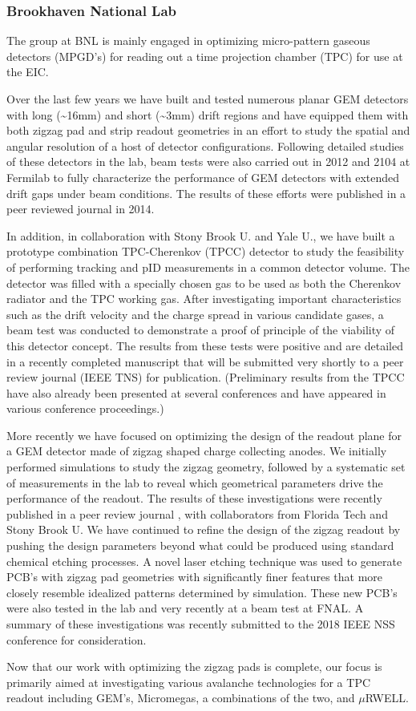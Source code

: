 \subsubsection{Brookhaven National Lab} 
The group at BNL is mainly engaged in optimizing micro-pattern gaseous detectors (MPGD’s) for reading out a time projection chamber (TPC) for use at the EIC. 

Over the last few years we have built and tested numerous planar GEM detectors with long (\textasciitilde16mm) and short (\textasciitilde3mm) drift regions and have equipped them with both zigzag pad and strip readout geometries in an effort to study the spatial and angular resolution of a host of detector configurations. Following detailed studies of these detectors in the lab, beam tests were also carried out in 2012 and 2104 at Fermilab to fully characterize the performance of GEM detectors with extended drift gaps under beam conditions. The results of these efforts were published in a peer reviewed journal in 2014\cite{7497629}.

In addition, in collaboration with Stony Brook U. and Yale U., we have built a prototype combination TPC-Cherenkov (TPCC) detector to study the feasibility of performing tracking and pID measurements in a common detector volume. The detector was filled with a specially chosen gas to be used as both the Cherenkov radiator and the TPC working gas. After investigating important characteristics such as the drift velocity and the charge spread in various candidate gases, a beam test was conducted to demonstrate a proof of principle of the viability of this detector concept. The results from these tests were positive and are detailed in a recently completed manuscript that will be submitted very shortly to a peer review journal (IEEE TNS) for publication. (Preliminary results from the TPCC have also already been presented at several conferences and have appeared in various conference proceedings\cite{Woody:2015ola}.)

More recently we have focused on optimizing the design of the readout plane for a GEM detector made of zigzag shaped charge collecting anodes. We initially performed simulations to study the zigzag geometry, followed by a systematic set of measurements in the lab to reveal which geometrical parameters drive the performance of the readout. The results of these investigations were recently published in a peer review journal \cite{8379440}, with collaborators from Florida Tech and Stony Brook U. We have continued to refine the design of the zigzag readout by pushing the design parameters beyond what could be produced using standard chemical etching processes. A novel laser etching technique was used to generate PCB’s with zigzag pad geometries with significantly finer features that more closely resemble idealized patterns determined by simulation. These new PCB’s were also tested in the lab and very recently at a beam test at FNAL. A summary of these investigations was recently submitted to the 2018 IEEE NSS conference for consideration. 

Now that our work with optimizing the zigzag pads is complete, our focus is primarily aimed at investigating various avalanche technologies for a TPC readout including GEM’s, Micromegas, a combinations of the two, and $\mu$RWELL. 

